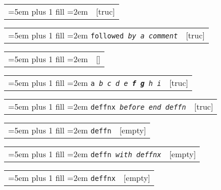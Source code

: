 \documentclass{book}
\begin{document}
\begin{titlepage}
%

\noindent\begin{tabularx}{\linewidth}{@{}Xr}
\rightskip=5em plus 1 fill
\hangindent=2em
\texttt{}& [truc]
\end{tabularx}


\noindent\begin{tabularx}{\linewidth}{@{}Xr}
\rightskip=5em plus 1 fill
\hangindent=2em
\texttt{followed \EmbracOn{}\textnormal{\textsl{by a comment}}\EmbracOff{}}& [truc]
\end{tabularx}

%

\noindent\begin{tabularx}{\linewidth}{@{}Xr}
\rightskip=5em plus 1 fill
\hangindent=2em
\texttt{}& []
\end{tabularx}


\noindent\begin{tabularx}{\linewidth}{@{}Xr}
\rightskip=5em plus 1 fill
\hangindent=2em
\texttt{a \EmbracOn{}\textnormal{\textsl{b c d e \textbf{f g} h i}}\EmbracOff{}}& [truc]
\end{tabularx}

%

\noindent\begin{tabularx}{\linewidth}{@{}Xr}
\rightskip=5em plus 1 fill
\hangindent=2em
\texttt{deffnx \EmbracOn{}\textnormal{\textsl{before end deffn}}\EmbracOff{}}& [truc]
\end{tabularx}

%



\noindent\begin{tabularx}{\linewidth}{@{}Xr}
\rightskip=5em plus 1 fill
\hangindent=2em
\texttt{deffn}& [empty]
\end{tabularx}

%


\noindent\begin{tabularx}{\linewidth}{@{}Xr}
\rightskip=5em plus 1 fill
\hangindent=2em
\texttt{deffn \EmbracOn{}\textnormal{\textsl{with deffnx}}\EmbracOff{}}& [empty]
\end{tabularx}

%

\noindent\begin{tabularx}{\linewidth}{@{}Xr}
\rightskip=5em plus 1 fill
\hangindent=2em
\texttt{deffnx}& [empty]
\end{tabularx}


\end{titlepage}
\end{document}
